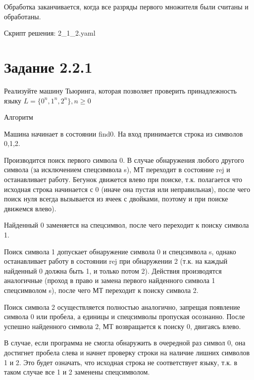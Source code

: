 \documentclass{article}
\begin{document}
Обработка заканчивается, когда все разряды первого множителя были считаны и обработаны.\newline

Скрипт решения: 2\_1\_2.yaml\newline


\section{Задание 2.2.1}
Реализуйте машину Тьюринга, которая позволяет проверить принадлежность языку\newline
$L=\{0^n,1^n,2^n\}, n \geq 0  $


Алгоритм\newline

Машина начинает в состоянии find0.\newline
На вход принимается строка из символов 0,1,2.

Производится поиск первого символа 0. В случае обнаружения любого другого символа (за исключением спецсимвола s), МТ переходит в состояние rej и останавливает работу. Бегунок движется влево при поиске, т.к. полагается что исходная строка начинается с 0 (иначе она пустая или неправильная), после чего поиск нуля всегда вызывается из ячеек с двойками, поэтому и при поиске движемся влево).\newline

Найденный 0 заменяется на спецсимвол, после чего переходит к поиску символа 1.\newline

Поиск символа 1 допускает обнаружение символа 0 и спецсимвола s, однако останавливает работу в состоянии rej при обнаружении 2 (т.к. на каждый найденный 0 должна быть 1, и только потом 2). Действия производятся аналогичные (проход в право и замена первого найденного символа 1 спецсимволом s), после чего МТ переходит к поиску символа 2.\newline 

Поиск символа 2 осуществляется полностью аналогично, запрещая появление символа 0 или пробела, а единицы и спецсимволы пропуская осознанно. После успешно найденного символа 2, МТ возвращается к поиску 0, двигаясь влево.\newline

В случае, если программа не смогла обнаружить в очередной раз символ 0, она достигнет пробела слева и начнет проверку строки на наличие лишних символов 1 и 2. Это будет означать, что исходная строка не соответствует языку, т.к. в таком случае все 1 и 2 заменены спецсимволом. \newline
\end{document}
